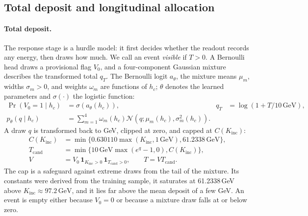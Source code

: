 \documentclass[11pt]{article}
\newcommand{\GeV}{\,\mathrm{GeV}}
\newcommand{\Kinc}{K_{\mathrm{inc}}}
\begin{document}
\subsection{Total deposit and longitudinal allocation}

\paragraph{Total deposit.} The response stage is a hurdle model: it first decides whether the readout records any energy, then draws how much. We call an event \emph{visible} if $T>0$. A Bernoulli head draws a provisional flag $V_0$, and a four-component Gaussian mixture describes the transformed total $q_T$. The Bernoulli logit $a_\theta$, the mixture means $\mu_m$, widths $\sigma_m>0$, and weights $\omega_m$ are functions of $h_c$; $\theta$ denotes the learned parameters and $\sigma(\cdot)$ the logistic function:
\begin{equation}
 \begin{aligned}
 \Pr(V_0=1\mid h_c)&=\sigma(a_\theta(h_c)),
 &q_T&=\log(1+T/10\GeV),\\
 p_\theta(q\mid h_c)&=\sum_{m=1}^{4}\omega_m(h_c)
 \mathcal N\!\left(q;\mu_m(h_c),\sigma_m^2(h_c)\right).
 \end{aligned}
 \label{eq:response_transform}
\end{equation}
A draw $q$ is transformed back to GeV, clipped at zero, and capped at $C(\Kinc)$:
\begin{equation}
 \begin{aligned}
 C(\Kinc)&=\min\{0.630110\max(\Kinc,1\GeV),61.2338\GeV\},\\
 T_{\mathrm{cand}}&=\min\{10\GeV\max(e^q-1,0),C(\Kinc)\},\\
 V&=V_0\,\mathbf 1_{\Kinc>0}\,\mathbf 1_{T_{\mathrm{cand}}>0},
 \qquad T=VT_{\mathrm{cand}}.
 \end{aligned}
 \label{eq:cap}
\end{equation}
The cap is a safeguard against extreme draws from the tail of the mixture. Its constants were derived from the training sample, it saturates at 61.2338\,GeV above $\Kinc\approx97.2\GeV$, and it lies far above the mean deposit of a few GeV. An event is empty either because $V_0=0$ or because a mixture draw falls at or below zero.
\end{document}
